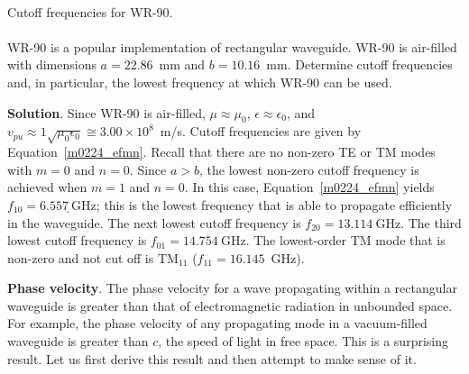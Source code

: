 ~\\ \begin{example} 
\label{m0224_exWR90}
\begin{mdframed}[backgroundcolor=brown!20,linecolor=brown!20]\raggedright
Cutoff frequencies for WR-90. 
\\~\\
WR-90 is a popular implementation of rectangular waveguide.
WR-90 is air-filled with dimensions $a=22.86$~mm and $b=10.16$~mm.
Determine cutoff frequencies and, in particular, the lowest frequency at which WR-90 can be used.

{\bf Solution}. 
Since WR-90 is air-filled, $\mu\approx\mu_0$, $\epsilon\approx\epsilon_0$, and $v_{pu} \approx {1}{\sqrt{\mu_0 \epsilon_0}} \cong 3.00 \times 10^8$~m/s.
Cutoff frequencies are given by Equation~\ref{m0224_efmn}.
Recall that there are no non-zero TE or TM modes with $m=0$ and $n=0$.
Since $a>b$, the lowest non-zero cutoff frequency is achieved when $m=1$ and $n=0$.
In this case, Equation~\ref{m0224_efmn} yields $f_{10} = \underline{6.557~\mbox{GHz}}$; this is the lowest frequency that is able to propagate efficiently in the waveguide.
The next lowest cutoff frequency is $f_{20} = 13.114~\mbox{GHz}$.
The third lowest cutoff frequency is $f_{01} = 14.754~\mbox{GHz}$.
The lowest-order TM mode that is non-zero and not cut off is TM$_{11}$ ($f_{11}=16.145$~\mbox{GHz}).

\end{mdframed}
\end{example}

{\bf Phase velocity}.
The phase velocity for a wave propagating within a rectangular waveguide is greater than that of electromagnetic radiation in unbounded space.
For example, the phase velocity of any propagating mode in a vacuum-filled waveguide is greater than $c$, the speed of light in free space.
This is a surprising result.
Let us first derive this result and then attempt to make sense of it.

